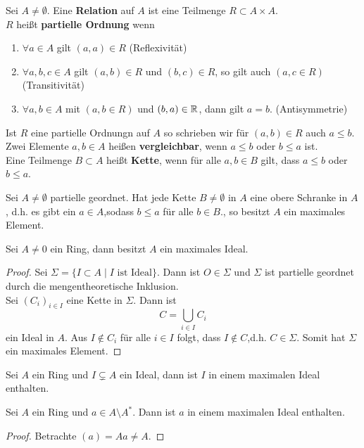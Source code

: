 	\begin{definition}
		Sei $A\neq\emptyset$. Eine \textbf{Relation} auf $A$ ist eine Teilmenge $R\subset A\times A$.\\
		$R$ heißt \textbf{partielle Ordnung} wenn
		\begin{enumerate}
			\item $\forall a\in A$ gilt $(a,a)\in R$ (Reflexivität)
			\item $\forall a,b,c\in A$ gilt $(a,b)\in R$ und $(b,c)\in R$, so gilt auch $(a,c\in R)$ (Transitivität)
			\item $\forall a,b\in A$ mit $(a,b\in R)$ und $(b,a)\in\mathbb{R}$, dann gilt $a=b$. (Antisymmetrie)
		\end{enumerate}
	
	Ist $R$ eine partielle Ordnungn auf $A$ so schrieben wir für $(a,b)\in R$ auch $a\leq b$.\\
	Zwei Elemente $a,b\in A$ heißen \textbf{vergleichbar}, wenn $a\leq b$ oder $b\leq a$ ist.\\
	Eine Teilmenge $B\subset A$ heißt \textbf{Kette}, wenn für alle $a,b\in B$ gilt, dass $a\leq b$ oder $b\leq a$.
	\end{definition}

	\begin{lem}
		Sei $A\neq \emptyset$ partielle geordnet. Hat jede Kette $B\neq \emptyset$ in $A$ eine obere Schranke in $A$, d.h. es gibt ein $a\in A$,sodass $b\leq a$ für alle $b\in B$., so besitzt $A$ ein maximales Element.
	\end{lem}

	\begin{theorem}
		Sei $A\neq 0$ ein Ring, dann besitzt $A$ ein maximales Ideal.
	\end{theorem}
	\begin{proof}
		Sei $\Sigma=\{I\subset A\mid \text{$I$ ist Ideal}\}$. Dann ist $O\in\Sigma$ und $\Sigma$ ist partielle geordnet durch die mengentheoretische Inklusion.\\
		Sei $(C_i)_{i\in I}$ eine Kette in $\Sigma$. Dann ist
		\[C=\bigcup_{i\in I}C_i\]
		ein Ideal in $A$. Aus $I\notin C_i$ für alle $i\in I$ folgt, dass $I\notin C$,d.h. $C\in\Sigma$. Somit hat $\Sigma$ ein maximales Element.
	\end{proof}

	\begin{kor}
		Sei $A$ ein Ring und $I\subsetneq A$ ein Ideal, dann ist $I$ in einem maximalen Ideal enthalten.
	\end{kor}
	\begin{kor}
		Sei $A$ ein Ring und $a\in A\setminus A^*$. Dann ist $a$ in einem maximalen Ideal enthalten.\\
	\end{kor}
	\begin{proof}
		Betrachte $(a)=Aa\neq A$.
	\end{proof}

